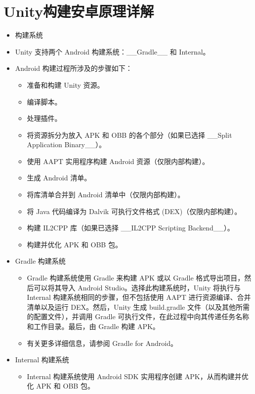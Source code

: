 \documentclass[9pt, b5paper]{article}
\begin{document}
\section{Unity构建安卓原理详解}
\label{sec-2}
\begin{itemize}
\item 构建系统
\item Unity 支持两个 Android 构建系统：\_\_Gradle\_\_ 和 Internal。
\item Android 构建过程所涉及的步骤如下：
\begin{itemize}
\item 准备和构建 Unity 资源。
\item 编译脚本。
\item 处理插件。
\item 将资源拆分为放入 APK 和 OBB 的各个部分（如果已选择 \_\_Split Application Binary\_\_）。
\item 使用 AAPT 实用程序构建 Android 资源（仅限内部构建）。
\item 生成 Android 清单。
\item 将库清单合并到 Android 清单中（仅限内部构建）。
\item 将 Java 代码编译为 Dalvik 可执行文件格式 (DEX)（仅限内部构建）。
\item 构建 IL2CPP 库（如果已选择 \_\_IL2CPP Scripting Backend\_\_）。
\item 构建并优化 APK 和 OBB 包。
\end{itemize}
\item Gradle 构建系统
\begin{itemize}
\item Gradle 构建系统使用 Gradle 来构建 APK 或以 Gradle 格式导出项目，然后可以将其导入 Android Studio。选择此构建系统时，Unity 将执行与 Internal 构建系统相同的步骤，但不包括使用 AAPT 进行资源编译、合并清单以及运行 DEX。然后，Unity 生成 build.gradle 文件（以及其他所需的配置文件），并调用 Gradle 可执行文件，在此过程中向其传递任务名称和工作目录。最后，由 Gradle 构建 APK。
\item 有关更多详细信息，请参阅 Gradle for Android。
\end{itemize}
\item Internal 构建系统
\begin{itemize}
\item Internal 构建系统使用 Android SDK 实用程序创建 APK，从而构建并优化 APK 和 OBB 包。
\end{itemize}
\end{itemize}
\end{document}
